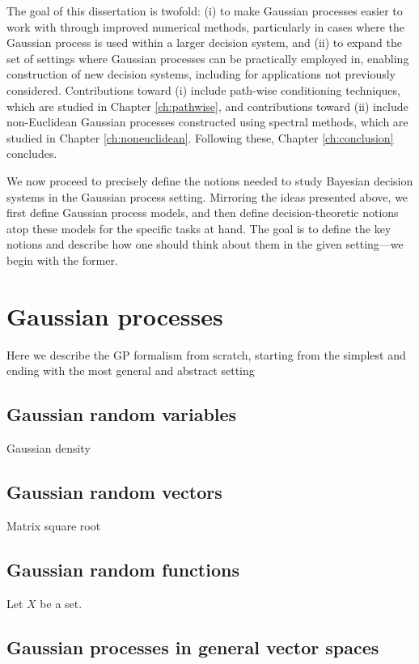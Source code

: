\documentclass[11pt]{book}
\begin{document}
The goal of this dissertation is twofold: (i) to make Gaussian processes easier to work with through improved numerical methods, particularly in cases where the Gaussian process is used within a larger decision system, and (ii) to expand the set of settings where Gaussian processes can be practically employed in, enabling construction of new decision systems, including for applications not previously considered.
Contributions toward (i) include path-wise conditioning techniques, which are studied in Chapter \ref{ch:pathwise}, and contributions toward (ii) include non-Euclidean Gaussian processes constructed using spectral methods, which are studied in Chapter \ref{ch:noneuclidean}.
Following these, Chapter \ref{ch:conclusion} concludes.

We now proceed to precisely define the notions needed to study Bayesian decision systems in the Gaussian process setting.
Mirroring the ideas presented above, we first define Gaussian process models, and then define decision-theoretic notions atop these models for the specific tasks at hand.
The goal is to define the key notions and describe how one should think about them in the given setting---we begin with the former.

\section{Gaussian processes}

Here we describe the GP formalism from scratch, starting from the simplest and ending with the most general and abstract setting

\subsection{Gaussian random variables}

Gaussian density

\subsection{Gaussian random vectors}

Matrix square root

\subsection{Gaussian random functions}

Let $X$ be a set. 

\subsection{Gaussian processes in general vector spaces}
\end{document}
